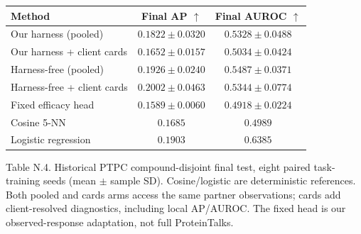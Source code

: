 \begin{center}\small\setlength{\tabcolsep}{7pt}
\begin{tabular}{lcc}
\toprule
Method & Final AP $\uparrow$ & Final AUROC $\uparrow$ \\
\midrule
Our harness (pooled) & $0.1822 \pm 0.0320$ & $0.5328 \pm 0.0488$ \\
Our harness + client cards & $0.1652 \pm 0.0157$ & $0.5034 \pm 0.0424$ \\
Harness-free (pooled) & $0.1926 \pm 0.0240$ & $0.5487 \pm 0.0371$ \\
Harness-free + client cards & $0.2002 \pm 0.0463$ & $0.5344 \pm 0.0774$ \\
Fixed efficacy head & $0.1589 \pm 0.0060$ & $0.4918 \pm 0.0224$ \\
Cosine 5-NN & $0.1685$ & $0.4989$ \\
Logistic regression & $0.1903$ & $0.6385$ \\
\bottomrule
\end{tabular}
\end{center}
Table N.4. Historical PTPC compound-disjoint final test, eight paired task-training seeds (mean $\pm$ sample SD). Cosine/logistic are deterministic references. Both pooled and cards arms access the same partner observations; cards add client-resolved diagnostics, including local AP/AUROC. The fixed head is our observed-response adaptation, not full ProteinTalks.
